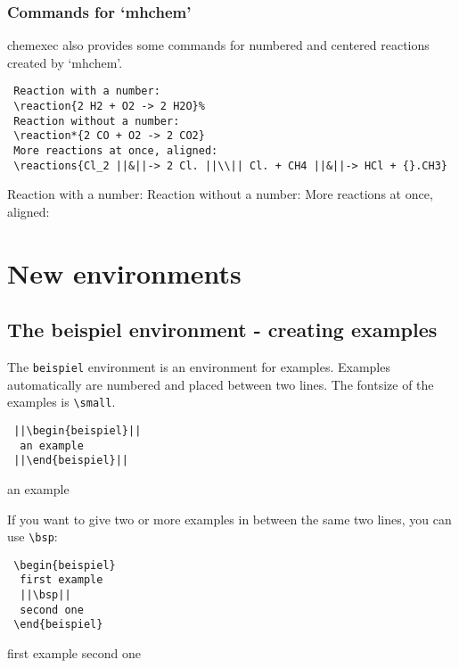 \documentclass[DIV10]{scrartcl}
\newcommand{\CEx}[1][8]{%
{\color{dunkelrot}\fontfamily{pag}\fontsize{#1}{#1}\selectfont chemexec}\xspace
}
\begin{document}
\subsubsection{Commands for `mhchem'}
\CEx also provides some commands for numbered and centered reactions created by `mh\-chem'.
\begin{lstlisting}
 Reaction with a number:
 \reaction{2 H2 + O2 -> 2 H2O}%
 Reaction without a number:
 \reaction*{2 CO + O2 -> 2 CO2}
 More reactions at once, aligned:
 \reactions{Cl_2 ||&||-> 2 Cl. ||\\|| Cl. + CH4 ||&||-> HCl + {}.CH3}
\end{lstlisting}
Reaction with a number:
%
Reaction without a number:
More reactions at once, aligned:

\section{New environments}
\subsection{The {\ttfamily beispiel} environment - creating examples}\label{ssec:beispiele}
The \verb=beispiel= environment is an environment for examples. Examples automatically are numbered and placed between two lines. The fontsize of the examples is \verb=\small=.
\begin{lstlisting}
 ||\begin{beispiel}||
  an example
 ||\end{beispiel}||
\end{lstlisting}
\begin{beispiel}
 an example
\end{beispiel}
\noindent If you want to give two or more examples in between the same two lines, you can use \verb=\bsp=:
\begin{lstlisting}
 \begin{beispiel}
  first example
  ||\bsp||
  second one
 \end{beispiel}
\end{lstlisting}
\begin{beispiel}
 first example
 \bsp
 second one
\end{beispiel}
\end{document}
